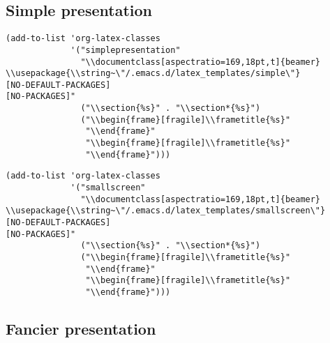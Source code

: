\documentclass[12pt]{article}
\begin{document}
\subsection{Simple presentation}
\label{sec:orge3064f9}

\begin{verbatim}
(add-to-list 'org-latex-classes
             '("simplepresentation"
               "\\documentclass[aspectratio=169,18pt,t]{beamer}
\\usepackage{\\string~\"/.emacs.d/latex_templates/simple\"}
[NO-DEFAULT-PACKAGES]
[NO-PACKAGES]"
               ("\\section{%s}" . "\\section*{%s}")
               ("\\begin{frame}[fragile]\\frametitle{%s}"
                "\\end{frame}"
                "\\begin{frame}[fragile]\\frametitle{%s}"
                "\\end{frame}")))
\end{verbatim}

\begin{verbatim}
(add-to-list 'org-latex-classes
             '("smallscreen"
               "\\documentclass[aspectratio=169,18pt,t]{beamer}
\\usepackage{\\string~\"/.emacs.d/latex_templates/smallscreen\"}
[NO-DEFAULT-PACKAGES]
[NO-PACKAGES]"
               ("\\section{%s}" . "\\section*{%s}")
               ("\\begin{frame}[fragile]\\frametitle{%s}"
                "\\end{frame}"
                "\\begin{frame}[fragile]\\frametitle{%s}"
                "\\end{frame}")))
\end{verbatim}


\subsection{Fancier presentation}
\label{sec:orgc7b3f81}
\end{document}
